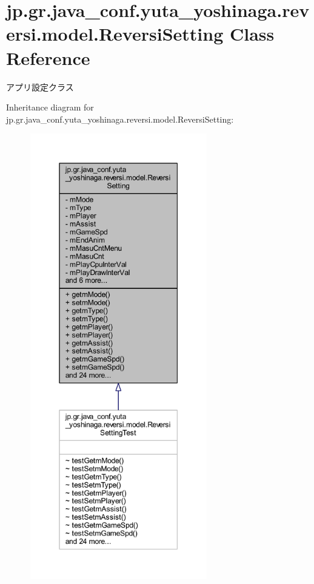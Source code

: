 \hypertarget{classjp_1_1gr_1_1java__conf_1_1yuta__yoshinaga_1_1reversi_1_1model_1_1_reversi_setting}{}\section{jp.\+gr.\+java\+\_\+conf.\+yuta\+\_\+yoshinaga.\+reversi.\+model.\+Reversi\+Setting Class Reference}
\label{classjp_1_1gr_1_1java__conf_1_1yuta__yoshinaga_1_1reversi_1_1model_1_1_reversi_setting}


アプリ設定クラス  




Inheritance diagram for jp.\+gr.\+java\+\_\+conf.\+yuta\+\_\+yoshinaga.\+reversi.\+model.\+Reversi\+Setting\+:\nopagebreak
\begin{figure}[H]
\begin{center}
\leavevmode
\includegraphics[height=550pt]{classjp_1_1gr_1_1java__conf_1_1yuta__yoshinaga_1_1reversi_1_1model_1_1_reversi_setting__inherit__graph}
\end{center}
\end{figure}


